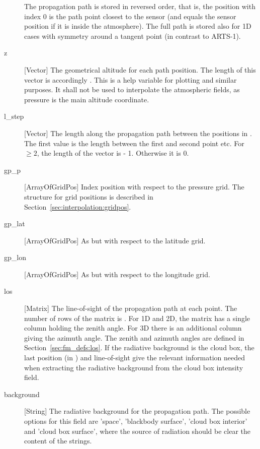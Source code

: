 \begin{description}
     The propagation path is stored in reversed order, that is, the
     position with index 0 is the path point closest to the sensor
     (and equals the sensor position if it is inside the atmosphere).
     The full path is stored also for 1D cases with symmetry around a
     tangent point (in contrast to ARTS-1). 
     
  \item[z] [Vector] The geometrical altitude for each path position. The
     length of this vector is accordingly . This is a help
     variable for plotting and similar purposes. It shall not be used to
     interpolate the atmospheric fields, as pressure is the main altitude
     coordinate.
     
   \item[l\_step] [Vector] The length along the propagation path
     between the positions in . The first value is the
     length between the first and second point etc. For 
     $\geq 2$, the length of the vector is  - 1.
     Otherwise it is 0.

   \item[gp\_p] [ArrayOfGridPos] Index position with respect to the
     pressure grid. The structure for grid positions is described in
     Section~\ref{sec:interpolation:gridpos}. 
     
   \item[gp\_lat] [ArrayOfGridPos] As  but with
     respect to the latitude grid.

   \item[gp\_lon] [ArrayOfGridPos] As  but with
     respect to the longitude grid.
     
   \item[los] [Matrix] The line-of-sight of the propagation path at
     each point. The number of rows of the matrix is .
     For 1D and 2D, the matrix has a single column holding the zenith
     angle. For 3D there is an additional column giving the azimuth
     angle. The zenith and azimuth angles are defined in
     Section~\ref{sec:fm_defs:los}. If the radiative background is the
     cloud box, the last position (in ) and
     line-of-sight give the relevant information needed when
     extracting the radiative background from the cloud box intensity
     field.
     
   \item[background] [String] The radiative background for the
     propagation path. The possible
     options for this field are 'space', 'blackbody surface', 'cloud
     box interior' and 'cloud box surface', where the source of
     radiation should be clear the content of the strings.
     

\end{description}
